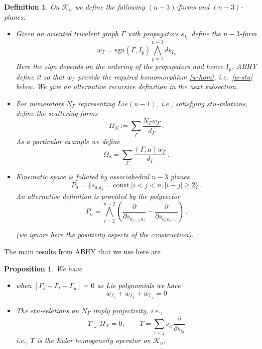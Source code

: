 \documentclass[11pt]{article}
\newcommand{\p}{\partial}
\newcommand{\cK}{\mathcal{K}}
\newcommand{\sgn}{\mathrm{sgn}}
\newcommand{\1}{{\rm 1\hskip-0.25em I}}
\newtheorem{defn}{Definition}[section]
\newtheorem{propn}{Proposition}[section]
\begin{document}
\begin{defn}
 On $\cK_n$ we define the following $(n-3)$-forms and $(n-3)$-planes:
\begin{itemize} 
\item
Given an oriented  trivalent graph $\Gamma$ with propagators $s_{I_p}$ define the $n-3$-form
\begin{equation}
w_\Gamma=\sgn(\Gamma,I_p)\bigwedge_{p=1}^{n-3} ds_{I_p}
\end{equation}
Here the sign depends on the ordering of the propagators and hence $I_p$.  ABHY \cite{Arkani-Hamed:2017mur} define it so that $w_\Gamma$ provide the required homomorphism \eqref{w-hom}, i.e.\ \eqref{w-stu} below.  We give an alternative recursive definition in the next subsection. 


\item  For numerators $N_\Gamma$ representing $Lie(n-1)$, i.e., satisfying $stu$-relations, define the scattering forms
\begin{equation}
\Omega_N:= \sum_{\Gamma} \frac{N_\Gamma w_\Gamma}{d_\Gamma}\, .
\end{equation}
As a particular example we define
\begin{equation}
\Omega_a= \sum_{\Gamma} \frac{(\Gamma ,a) w_\Gamma}{d_\Gamma}\, .
\end{equation}
\item  Kinematic space is foliated  by associahedral $n-3$ planes 
\begin{equation}
P_a= \{ s_{a_ia_j}=\mbox{const.}|i<j<n, |i-j|\geq 2\}\, .
\end{equation}
An alternative definition is provided by the polyvector
\begin{equation}
P_{a }=\bigwedge_{i=2}^{n-2}\left( \frac{\p}{\p s_{a_{i-1}\, a_i}}-\frac{\p}{\p s_{a_i\,a_{i+1}}}\right)\, .
\end{equation}

 (we ignore here the positivity aspects of the construction).

\end{itemize}
\end{defn}
The main results from ABHY that we use here are
\begin{propn}
We  have 
\begin{itemize}
\item
when $[\Gamma_s+\Gamma_t+\Gamma_u]=0$ as Lie polynomials we have
\begin{equation}
w_{\Gamma_s}+w_{\Gamma_t}+w_{\Gamma_u}=0\label{w-stu}
\end{equation}
\item The $stu$-relations on $N_\Gamma$ imply 
projectivity, i.e., 
\begin{equation}
\Upsilon \lrcorner \, \Omega_N=0,\qquad\Upsilon=\sum_{i<j}s_{ij}\frac{\p}{\p s_{ij}}
\end{equation}
i.e., $\Upsilon$ is the Euler homogeneity operator on $\cK_n$.

\end{itemize}
\end{propn}
\end{document}
